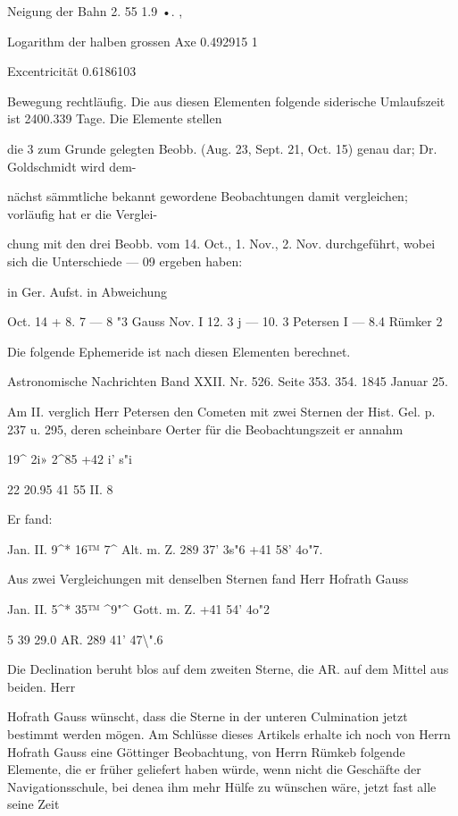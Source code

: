 \documentclass[10pt,a4paper]{article}
\begin{document}
Neigung der Bahn 2. 55 1.9 •. ,

Logarithm der halben grossen Axe 0.492915 1

Excentricität 0.6186103

Bewegung rechtläufig. Die aus diesen Elementen folgende siderische Umlaufszeit ist 2400.339 Tage. Die Elemente stellen

die 3 zum Grunde gelegten Beobb. (Aug. 23, Sept. 21, Oct. 15) genau dar; Dr. Goldschmidt wird dem-

nächst sämmtliche bekannt gewordene Beobachtungen damit vergleichen; vorläufig hat er die Verglei-

chung mit den drei Beobb. vom 14. Oct., 1. Nov., 2. Nov. durchgeführt, wobei sich die Unterschiede — 09 ergeben haben:

in Ger. Aufst. in Abweichung

Oct. 14 + 8. 7 — 8 "3 Gauss Nov. I 12. 3 j — 10. 3 Petersen I — 8.4 Rümker 2

Die folgende Ephemeride ist nach diesen Elementen berechnet.

Astronomische Nachrichten Band XXII. Nr. 526. Seite 353. 354. 1845 Januar 25.

Am II. verglich Herr Petersen den Cometen mit zwei Sternen der Hist. Gel. p. 237 u. 295, deren scheinbare Oerter für die Beobachtungszeit er annahm

19\textasciicircum{} 2i\textdegree{}» 2\textasciicircum{}85 +42\textdegree{} i' s"i

22 20.95 41 55 II. 8

Er fand:

Jan. II. 9\textasciicircum{}* 16™ 7\textasciicircum{} Alt. m. Z. 289\textdegree{} 37' 3s"6 +41\textdegree{} 58' 4o"7.

Aus zwei Vergleichungen mit denselben Sternen fand Herr Hofrath Gauss

Jan. II. 5\textasciicircum{}* 35™ \textasciicircum{}9"\textasciicircum{} Gott. m. Z. +41\textdegree{} 54' 4o"2

5 39 29.0 AR. 289\textdegree{} 41' 47\textbackslash{}".6

Die Declination beruht blos auf dem zweiten Sterne, die AR. auf dem Mittel aus beiden. Herr

Hofrath Gauss wünscht, dass die Sterne in der unteren Culmination jetzt bestimmt werden mögen. Am Schlüsse dieses Artikels erhalte ich noch von Herrn Hofrath Gauss eine Göttinger Beobachtung, von Herrn Rümkeb folgende Elemente, die er früher geliefert haben würde, wenn nicht die Geschäfte der Navigationsschule, bei denea ihm mehr Hülfe zu wünschen wäre, jetzt fast alle seine Zeit
\end{document}
